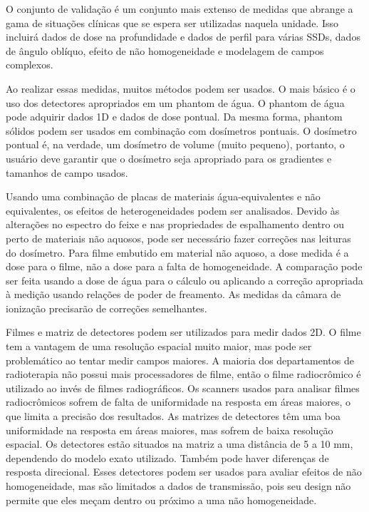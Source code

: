 \documentclass[11pt,a4paper]{article}
\begin{document}
	O conjunto de validação é um conjunto mais extenso de medidas que abrange a gama de situações clínicas que se espera ser utilizadas naquela unidade. Isso incluirá dados de dose na profundidade e dados de perfil para várias SSDs, dados de ângulo oblíquo, efeito de não homogeneidade e modelagem de campos complexos. 

	Ao realizar essas medidas, muitos métodos podem ser usados. O mais básico é o uso dos detectores apropriados em um phantom de água. O phantom de água pode adquirir dados 1D e dados de dose pontual. Da mesma forma, phantom sólidos podem ser usados em combinação com dosímetros pontuais. O dosímetro pontual é, na verdade, um dosímetro de volume (muito pequeno), portanto, o usuário deve garantir que o dosímetro seja apropriado para os gradientes e tamanhos de campo usados.

	Usando uma combinação de placas de materiais água-equivalentes e não equivalentes, os efeitos de heterogeneidades podem ser analisados. Devido às alterações no espectro do feixe e nas propriedades de espalhamento dentro ou perto de materiais não aquosos, pode ser necessário fazer correções nas leituras do dosímetro. Para filme embutido em material não aquoso, a dose medida é a dose para o filme, não a dose para a falta de homogeneidade. A comparação pode ser feita usando a dose de água para o cálculo ou aplicando a correção apropriada à medição usando relações de poder de freamento. As medidas da câmara de ionização precisarão de correções semelhantes.

	Filmes e  matriz de detectores podem ser utilizados para medir dados 2D. O filme tem a vantagem de uma resolução espacial muito maior, mas pode ser problemático ao tentar medir campos maiores. A maioria dos departamentos de radioterapia não possui mais processadores de filme, então o filme radiocrômico é utilizado ao invés de filmes radiográficos. Os scanners usados para analisar filmes radiocrômicos sofrem de falta de uniformidade na resposta em áreas maiores, o que limita a precisão dos resultados. As matrizes de detectores têm uma boa uniformidade na resposta em áreas maiores, mas sofrem de baixa resolução espacial. Os detectores estão situados na matriz a uma distância de 5 a 10 mm, dependendo do modelo exato utilizado. Também pode haver diferenças de resposta direcional. Esses detectores podem ser usados para avaliar efeitos de não homogeneidade, mas são limitados a dados de transmissão, pois seu design não permite que eles meçam dentro ou próximo a uma não homogeneidade.
\end{document}
